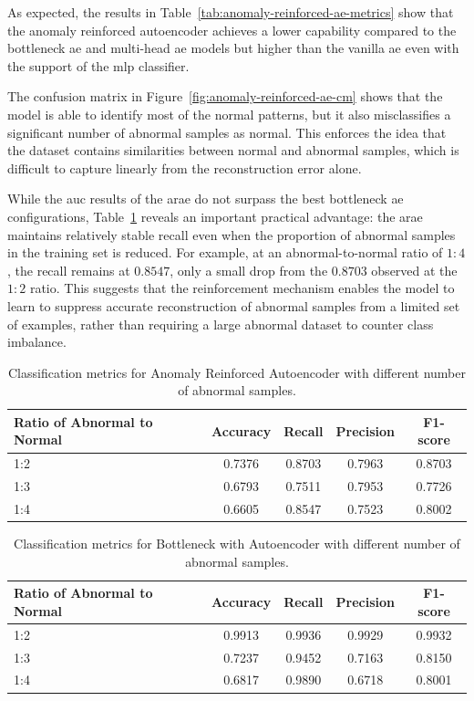 As expected, the results in Table~\ref{tab:anomaly-reinforced-ae-metrics} show that the anomaly reinforced autoencoder achieves a lower capability compared to the bottleneck \gls{ae} and multi-head \gls{ae} models but higher than the vanilla \gls{ae} even with the support of the \gls{mlp} classifier.

The confusion matrix in Figure~\ref{fig:anomaly-reinforced-ae-cm} shows that the model is able to identify most of the normal patterns, but it also misclassifies a significant number of abnormal samples as normal.
This enforces the idea that the dataset contains similarities between normal and abnormal samples, which is difficult to capture linearly from the reconstruction error alone.

While the \gls{auc} results of the \gls{arae} do not surpass the best bottleneck \gls{ae} configurations,  
Table~\ref{tab:anomaly-reinforced-ae-abnorm-ratios} reveals an important practical advantage:  
the \gls{arae} maintains relatively stable recall even when the proportion of abnormal samples in the training set is reduced.
For example, at an abnormal-to-normal ratio of $1:4$, the recall remains at $0.8547$, only a small drop from the $0.8703$ observed at the $1:2$ ratio.
This suggests that the reinforcement mechanism enables the model to learn to suppress accurate reconstruction of abnormal samples from a limited set of examples, rather than requiring a large abnormal dataset to counter class imbalance.

\begin{table}[h!]
\centering
\caption{Classification metrics for Anomaly Reinforced Autoencoder with different number of abnormal samples.}
\label{tab:anomaly-reinforced-ae-abnorm-ratios}
\begin{tabular}{lcccc}
    \toprule
    \textbf{Ratio of Abnormal to Normal} & \textbf{Accuracy} & \textbf{Recall} & \textbf{Precision} & \textbf{F1-score}  \\
    \midrule
    1:2 & 0.7376 & 0.8703 & 0.7963 & 0.8703 \\
    1:3 & 0.6793 & 0.7511 & 0.7953 & 0.7726 \\
    1:4 & 0.6605 & 0.8547 & 0.7523 & 0.8002 \\

    \bottomrule
\end{tabular}
\end{table}


\begin{table}[h!]
\centering
\caption{Classification metrics for Bottleneck with Autoencoder with different number of abnormal samples.}
\label{tab:bottleneck-ae-abnorm-abnorm-ratios}
\begin{tabular}{lcccc}
    \toprule
    \textbf{Ratio of Abnormal to Normal} & \textbf{Accuracy} & \textbf{Recall} & \textbf{Precision} & \textbf{F1-score}  \\
    \midrule
    1:2 & 0.9913 & 0.9936 & 0.9929 & 0.9932 \\
    1:3 & 0.7237 & 0.9452 & 0.7163 & 0.8150 \\
    1:4 & 0.6817 & 0.9890 & 0.6718 & 0.8001 \\
    \bottomrule
\end{tabular}
\end{table}

